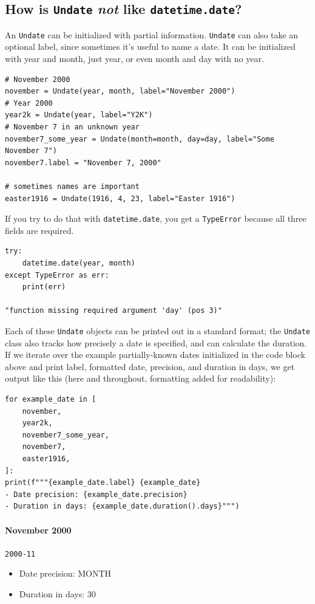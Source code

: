 \documentclass{anthology-ch}         %
\begin{document}
\subsection{How is \texttt{Undate} \textit{not} like \texttt{datetime.date}?}

An \texttt{Undate} can be initialized with partial information.  \texttt{Undate} can also take an optional label, since sometimes it's useful to name a date.  It can be initialized with year and month, just year, or even month and day with no year.

\begin{verbatim}
# November 2000
november = Undate(year, month, label="November 2000")
# Year 2000
year2k = Undate(year, label="Y2K")
# November 7 in an unknown year
november7_some_year = Undate(month=month, day=day, label="Some November 7")
november7.label = "November 7, 2000"

# sometimes names are important
easter1916 = Undate(1916, 4, 23, label="Easter 1916")
\end{verbatim}


If you try to do that with \texttt{datetime.date}, you get a
\texttt{TypeError} because all three fields are required.

\begin{verbatim}
try:
    datetime.date(year, month)
except TypeError as err:
    print(err)

"function missing required argument 'day' (pos 3)"
\end{verbatim}


Each of these \texttt{Undate} objects can be printed out in a standard
format; the \texttt{Undate} class also tracks how precisely a date is
specified, and can calculate the duration.  If we iterate over the
example partially-known dates initialized in the code block above and print label, formatted date, precision, and duration in days, we get output like this (here and throughout, formatting added for readability):

\begin{verbatim}
for example_date in [
    november,
    year2k,
    november7_some_year,
    november7,
    easter1916,
]:
print(f"""{example_date.label} {example_date}
- Date precision: {example_date.precision}
- Duration in days: {example_date.duration().days}""")
\end{verbatim}

\paragraph{November 2000} \texttt{2000-11}
\begin{itemize}
    \item Date precision: MONTH
    \item Duration in days: 30
\end{itemize}
\end{document}
